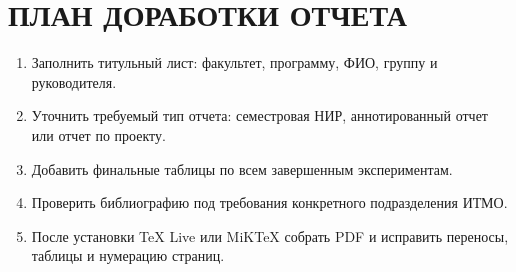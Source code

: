 \documentclass[14pt,a4paper]{extreport}
\begin{document}
\chapter{ПЛАН ДОРАБОТКИ ОТЧЕТА}

\begin{enumerate}
  \item Заполнить титульный лист: факультет, программу, ФИО, группу и
    руководителя.
  \item Уточнить требуемый тип отчета: семестровая НИР, аннотированный отчет
    или отчет по проекту.
  \item Добавить финальные таблицы по всем завершенным экспериментам.
  \item Проверить библиографию под требования конкретного подразделения ИТМО.
  \item После установки TeX Live или MiKTeX собрать PDF и исправить переносы,
    таблицы и нумерацию страниц.
\end{enumerate}
\end{document}
